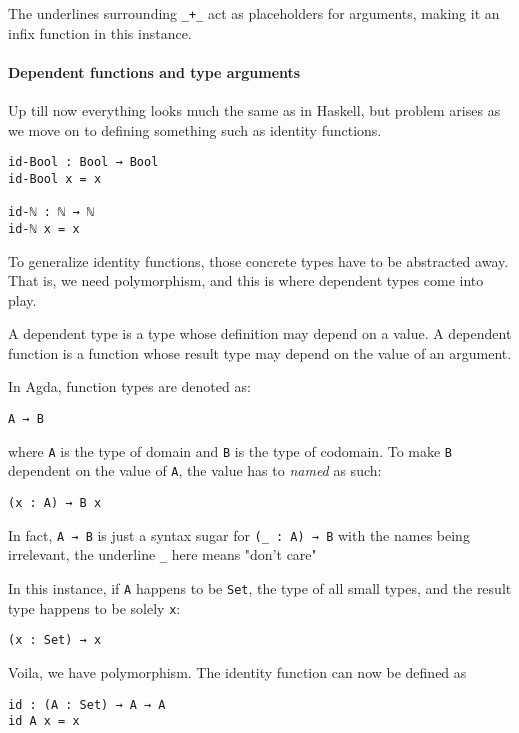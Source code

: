 \documentclass[12pt, a4paper]{article}
\begin{document}
The underlines surrounding {\lstinline|_+_|} act as placeholders for arguments, making
it an infix function in this instance.

\paragraph{Dependent functions and type arguments}
Up till now everything looks much the same as in Haskell, but problem arises as
we move on to defining something such as identity functions.

\begin{lstlisting}
id-Bool : Bool → Bool
id-Bool x = x

id-ℕ : ℕ → ℕ
id-ℕ x = x
\end{lstlisting}

To generalize identity functions, those concrete types have to be abstracted
away. That is, we need polymorphism, and this is where dependent types come into
play.

A dependent type is a type whose definition may depend on a value. A dependent
function is a function whose result type may depend on the value of an argument.

In Agda, function types are denoted as:
\begin{lstlisting}
A → B
\end{lstlisting}
where {\lstinline|A|} is the type of domain and {\lstinline|B|} is the type of
codomain. To make {\lstinline|B|} dependent on the value of {\lstinline|A|}, the
value has to \textit{named} as such:

\begin{lstlisting}
(x : A) → B x
\end{lstlisting}

In fact, {\lstinline|A → B|} is just a syntax sugar for {\lstinline|(_ : A) → B|}
with the names being irrelevant, the underline {\lstinline|_|} here means "don't care"

In this instance, if {\lstinline|A|} happens to be {\lstinline|Set|}, the type
of all small types, and the result type happens to be solely {\lstinline|x|}:

\begin{lstlisting}
(x : Set) → x
\end{lstlisting}

Voila, we have polymorphism. The identity function can now be defined as

\begin{lstlisting}
id : (A : Set) → A → A
id A x = x
\end{lstlisting}
\end{document}
